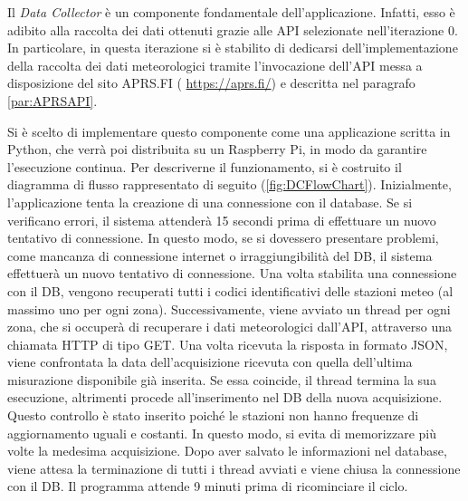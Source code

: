 Il \textit{Data Collector} è un componente fondamentale dell'applicazione. Infatti, esso è adibito alla raccolta dei dati ottenuti grazie alle API selezionate nell'iterazione 0. In particolare, in questa iterazione si è stabilito di dedicarsi dell'implementazione della raccolta dei dati meteorologici tramite l'invocazione dell'API messa a disposizione del sito APRS.FI ( \url{https://aprs.fi/}) e descritta nel paragrafo \ref{par:APRSAPI}. 

Si è scelto di implementare questo componente come una applicazione scritta in Python, che verrà poi distribuita su un Raspberry Pi, in modo da garantire l'esecuzione continua. Per descriverne il funzionamento, si è costruito il diagramma di flusso rappresentato di seguito (\Fig\ref{fig:DCFlowChart}). Inizialmente, l'applicazione tenta la creazione di una connessione con il database. Se si verificano errori, il sistema attenderà 15 secondi prima di effettuare un nuovo tentativo di connessione. In questo modo, se si dovessero presentare problemi, come mancanza di connessione internet o irraggiungibilità del DB, il sistema effettuerà un nuovo tentativo di connessione. Una volta stabilita una connessione con il DB, vengono recuperati tutti i codici identificativi delle stazioni meteo (al massimo uno per ogni zona). Successivamente, viene avviato un thread per ogni zona, che si occuperà di recuperare i dati meteorologici dall'API, attraverso una chiamata HTTP di tipo GET. Una volta ricevuta la risposta in formato JSON, viene confrontata la data dell'acquisizione ricevuta con quella dell'ultima misurazione disponibile già inserita. Se essa coincide, il thread termina la sua esecuzione, altrimenti procede all'inserimento nel DB della nuova acquisizione. Questo controllo è stato inserito poiché le stazioni non hanno frequenze di aggiornamento uguali e costanti. In questo modo, si evita di memorizzare più volte la medesima acquisizione. Dopo aver salvato le informazioni nel database, viene attesa la terminazione di tutti i thread avviati e viene chiusa la connessione con il DB. Il programma attende 9 minuti prima di ricominciare il ciclo. 

